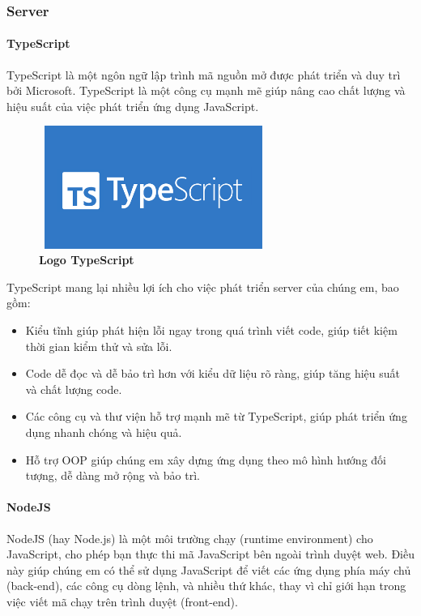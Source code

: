 \subsubsection{Server}
\paragraph{TypeScript}
\mbox{}

TypeScript là một ngôn ngữ lập trình mã nguồn mở được phát triển và duy trì bởi Microsoft. TypeScript là một công cụ mạnh mẽ giúp nâng cao chất lượng và hiệu suất của việc phát triển ứng dụng JavaScript. 

\begin{figure}[H]
  \centering
  \includegraphics[width=7.5cm,height=4cm]{Images/Technology/typescript.png}
  \caption[Logo TypeScript]{\bfseries \fontsize{12pt}{0pt}
  \selectfont Logo TypeScript}
  \label{typescript} %
\end{figure}

TypeScript mang lại nhiều lợi ích cho việc phát triển server của chúng em, bao gồm:
\begin{itemize}
  \item Kiểu tĩnh giúp phát hiện lỗi ngay trong quá trình viết code, giúp tiết kiệm thời gian kiểm thử và sửa lỗi.
  \item Code dễ đọc và dễ bảo trì hơn với kiểu dữ liệu rõ ràng, giúp tăng hiệu suất và chất lượng code.
  \item Các công cụ và thư viện hỗ trợ mạnh mẽ từ TypeScript, giúp phát triển ứng dụng nhanh chóng và hiệu quả.
  \item Hỗ trợ OOP giúp chúng em xây dựng ứng dụng theo mô hình hướng đối tượng, dễ dàng mở rộng và bảo trì.
\end{itemize}

\paragraph{NodeJS}
\mbox{}

NodeJS (hay Node.js) là một môi trường chạy (runtime environment) cho JavaScript, cho phép bạn thực thi mã JavaScript bên ngoài trình duyệt web. Điều này giúp chúng em có thể sử dụng JavaScript để viết các ứng dụng phía máy chủ (back-end), các công cụ dòng lệnh, và nhiều thứ khác, thay vì chỉ giới hạn trong việc viết mã chạy trên trình duyệt (front-end).


